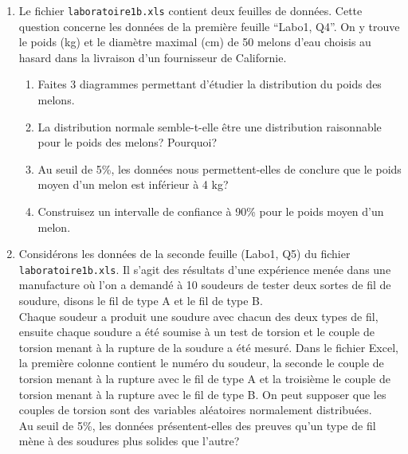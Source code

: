 \documentclass[12pt]{article}
\begin{document}
\begin{enumerate}

\item Le fichier {\tt laboratoire1b.xls}  contient deux feuilles de données. Cette question concerne les données de la première feuille ``Labo1, Q4''. On y trouve le poids (kg) et le diamètre maximal (cm) de 50 melons d'eau choisis au hasard dans la livraison  d'un fournisseur de Californie.
\begin{enumerate}
\item Faites 3 diagrammes permettant d'étudier la distribution du poids des melons.
\item La distribution normale semble-t-elle être une distribution raisonnable pour le poids des melons? Pourquoi?
\item Au seuil de 5\%, les données nous permettent-elles de conclure que le poids moyen d'un melon est inférieur à 4 kg?
\item Construisez un intervalle de confiance à 90\% pour le poids moyen d'un melon.
\end{enumerate}

\vspace{5mm}

\item Considérons les données de la seconde feuille (Labo1, Q5) du fichier {\tt labo\-ratoire1b.xls}. Il s'agit des résultats d'une expérience menée dans une manufacture où l'on a demandé à 10 soudeurs de tester deux sortes de fil de soudure, disons le fil de type A et le fil de type B. \\

    Chaque soudeur a produit une soudure avec chacun des deux types de fil, ensuite chaque soudure a été soumise à un test de torsion et le couple de torsion menant à la rupture de la soudure a été mesuré. Dans le fichier Excel, la première colonne contient le numéro du soudeur, la seconde le couple de torsion menant à la rupture avec le fil de type A et la troisième le couple de torsion menant à la rupture avec le fil de type B. On peut supposer que les couples de torsion sont des variables aléatoires normalement distribuées. \\

    Au seuil de 5\%, les données présentent-elles des preuves qu'un type de fil mène à des soudures plus solides que l'autre?



\end{enumerate}
\end{document}
